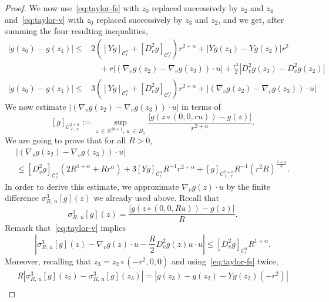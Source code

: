\documentclass[10pt]{amsart}
\theoremstyle{definition}\newtheorem{defi}[theo]{Definition}\newtheorem{rema}[theo]{Remark}\newtheorem{exam}[theo]{Example}\newtheorem{exem}[theo]{Example}\newtheorem{nota}[theo]{Notation}
\newcommand{\R}{\mathbb{R}}
\newcommand{\cC}{\mathcal{C}}
\begin{document}
\begin{proof}
\goodbreak
We now use~\eqref{eq:taylor-fs} with $z_0$ replaced successively by $z_2$ and $z_4$ and~\eqref{eq:taylor-v} with $z_0$ replaced successively by $z_3$ and $z_2$, and we get, after summing the four resulting inequalities,
\begin{equation}\label{e:almost}
\begin{aligned}
\left|g(z_0) -g(z_1)\right| \le & 2 \left([Yg]_{\cC^\alpha_\ell} + \left[D^2_v g\right]_{\cC^\alpha_\ell}\right) r^{2+\alpha} + \left| Yg (z_4)-Yg(z_2)\right| r^2 \\
&\quad+ r \left| \left(\nabla_vg (z_2)-\nabla_v g (z_3)\right) \cdot u \right| + \frac{r^2} 2 \left| D_v^2 g (z_3)-D_v^2 g(z_2)\right| \\
\left|g(z_0) -g(z_1)\right| \le & 3\left([Yg]_{\cC^\alpha_\ell} + \left[D^2_v g\right]_{\cC^\alpha_\ell}\right) r^{2+\alpha}+ \left| \left(\nabla_vg (z_2)-\nabla_v g (z_3)\right) \cdot u \right|
\end{aligned}
\end{equation}
We now estimate $| (\nabla_vg (z_2)-\nabla_v g (z_3)) \cdot u |$ in terms of
\[
[g]_{\cC^{2+\alpha}_{\ell,\,x} } := \sup_{z\,\in\,\R^{2d+1}, \,u\,\in\,B_1} \frac{|g(z \circ (0,0,ru)) - g(z)|}{r^{2+\alpha}}.
\]
We are going to prove that for all $R>0$,
\begin{multline}\label{e:dvx}
\left| \left(\nabla_vg (z_2)-\nabla_v g (z_3)\right) \cdot u \right|\\
\le \left[D^2_v g\right]_{\cC^\alpha_\ell} \left(2R^{1+\alpha}+Rr^\alpha\right) + 3 [Yg]_{\cC^\alpha_\ell} R^{-1} r^{2+\alpha} + [g]_{\cC^{2+\alpha}_{\ell,\,x}} R^{-1} \left(r^2 R\right)^{\frac{2+\alpha}3}.
\end{multline}
In order to derive this estimate, we approximate $\nabla_v g (z) \cdot u$ by the finite difference $\sigma^3_{R,\,u}[g](z)$ we already used above. Recall that
\[
\sigma^3_{R,\,u} [g](z) = \frac{|g(z \circ (0,0,Ru)) - g(z)|}{R}.
\]
Remark that~\eqref{eq:taylor-v} implies
\begin{equation}\label{e:1}
\left|\sigma^3_{R,\,u} [g] (z) - \nabla_v g (z) \cdot u - \frac{R}2 D^2_v g (z) u \cdot u \right| \le \left[D^2_v g\right]_{\cC^\alpha_\ell} R^{1+\alpha}.
\end{equation}
Moreover, recalling that $z_3 = z_2 \circ (-r^2,0,0)$ and using~\eqref{eq:taylor-fs} twice,
\begin{multline} \label{e:2}
 R \left|\sigma^3_{R,\,u} [g](z_2) - \sigma^3_{R,\,u} [g](z_3) \right|
 = \left| g(z_3) - g(z_2) - Yg (z_2) \left(-r^2\right) \right| \\

\end{multline}
\end{proof}
\end{document}
